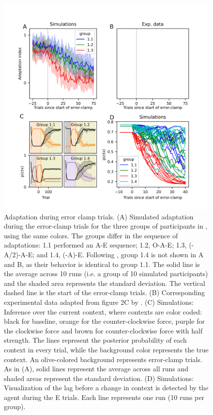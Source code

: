 \documentclass[a4paper,doc,floatsintext,natbib]{apa6}%
\begin{document}
\begin{figure}
\centering
\includegraphics[width=\textwidth]{./figures/figure_4.png}
\caption{Adaptation during error clamp trials. (A) Simulated adaptation during the error-clamp trials for the three groups of participants in \cite{Vaswani_Decay_2013}, using the same colors. The groups differ in the sequence of adaptations: 1.1 performed an A-E sequence; 1.2, O-A-E; 1.3, (-A/2)-A-E; and 1.4, (-A)-E. Following \cite{Vaswani_Decay_2013}, group 1.4 is not shown in A and B, as their behavior is identical to group 1.1. The solid line is the average across 10 runs (i.e. a group of 10 simulated participants) and the shaded area represents the standard deviation. The vertical dashed line is the start of the error-clamp trials. (B) Corresponding experimental data adapted from figure 2C by \cite{Vaswani_Decay_2013}. (C) Simulations: Inference over the current context, where contexts are color coded: black for baseline, orange for the counter-clockwise force, purple for the clockwise force and brown for counter-clockwise force with half strength. The lines represent the posterior probability of each context in every trial, while the background color represents the true context. An olive-colored background represents error-clamp trials. As in (A), solid lines represent the average across all runs and shaded areas represent the standard deviation. (D) Simulations: Visualization of the lag before a change in context is detected by the agent during the E trials. Each line represents one run (10 runs per group).}
\label{fig:vaswani-2013}
\end{figure}
\end{document}
